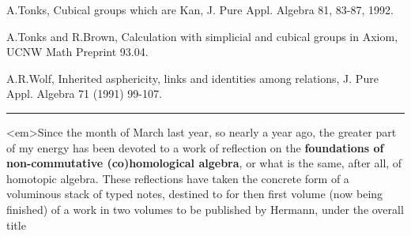 A.Tonks, Cubical groups which are Kan, J. Pure Appl. Algebra
81,  83-87, 1992.  

A.Tonks and R.Brown, Calculation with simplicial and cubical
groups in Axiom, UCNW Math Preprint 93.04. 

A.R.Wolf, Inherited asphericity, links and identities among
relations, J. Pure Appl. Algebra 71 (1991) 99-107. 


\par\noindent\rule{\textwidth}{0.4pt}
<em>Since the month of March last year, so nearly a year ago, the
greater part of my energy has been devoted to a work of reflection on
the \textbf{foundations of non-commutative (co)homological algebra},
or what is the same, after all, of homotopic algebra.  These reflections
have taken the concrete form of a voluminous stack of typed notes, 
destined to for then first volume (now being finished) of a work in
two volumes to be published by Hermann, under the overall title


